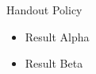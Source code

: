 \documentclass[14pt,t,overlay-policy=handout]{beamer-accessibility}
\begin{document}
\begin{frame}{Handout Policy}
\begin{itemize}
\item<1-> Result Alpha
\item<2-> Result Beta
\end{itemize}
\end{frame}
\end{document}
